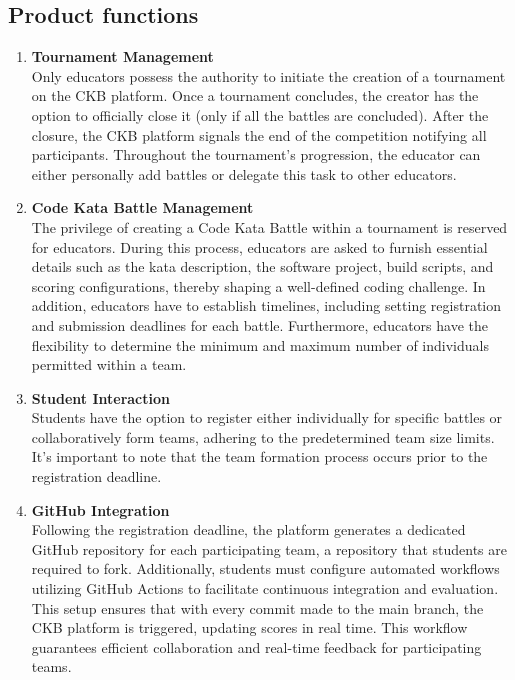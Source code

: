 \subsection{Product functions}
\begin{enumerate}
    \item \textbf{Tournament Management} \\
    Only educators possess the authority to initiate the creation of a tournament on the CKB platform. Once a tournament concludes, the creator has the option to officially close it (only if all the battles are concluded). After the closure, the CKB platform signals the end of the competition notifying all participants. Throughout the tournament's progression, the educator can either personally add battles or delegate this task to other educators.

    \item \textbf{Code Kata Battle Management} \\
    The privilege of creating a Code Kata Battle within a tournament is reserved for educators. During this process, educators are asked to furnish essential details such as the kata description, the software project, build scripts, and scoring configurations, thereby shaping a well-defined coding challenge. In addition, educators have to establish timelines, including setting registration and submission deadlines for each battle. Furthermore, educators have the flexibility to determine the minimum and maximum number of individuals permitted within a team.

    \item \textbf{Student Interaction} \\
    Students have the option to register either individually for specific battles or collaboratively form teams, adhering to the predetermined team size limits. It's important to note that the team formation process occurs prior to the registration deadline.

    \item \textbf{GitHub Integration} \\
    Following the registration deadline, the platform generates a dedicated GitHub repository for each participating team, a repository that students are required to fork. Additionally, students must configure automated workflows utilizing GitHub Actions to facilitate continuous integration and evaluation. This setup ensures that with every commit made to the main branch, the CKB platform is triggered, updating scores in real time. This workflow guarantees efficient collaboration and real-time feedback for participating teams.


\end{enumerate}
